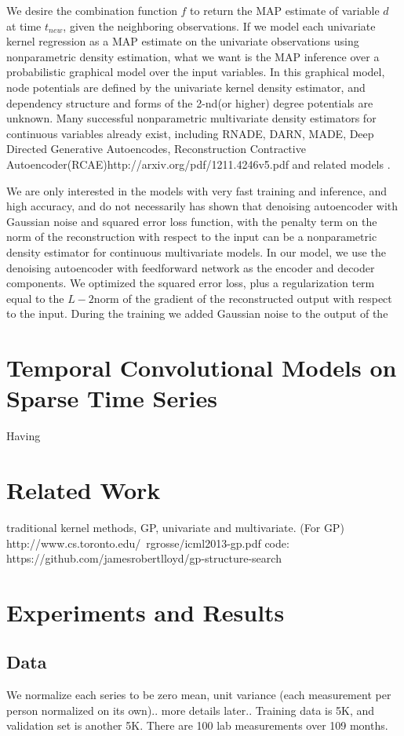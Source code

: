 \documentclass{article} %
\begin{document}
We desire the combination function $f$ to return the MAP estimate of variable $d$ at time $t_{new}$, given the neighboring observations. If we model each univariate kernel regression as a MAP estimate on the univariate observations using nonparametric density estimation, what we want is the MAP inference over a probabilistic graphical model over the input variables. In this graphical model, node potentials are defined by the univariate kernel density estimator, and dependency structure and forms of the 2-nd(or higher) degree potentials are unknown. 
Many successful nonparametric multivariate density estimators for continuous variables already exist, including RNADE\cite{}, DARN\cite{}, MADE\cite{}, Deep Directed Generative Autoencodes\cite{}, Reconstruction Contractive Autoencoder(RCAE)\cite{}http://arxiv.org/pdf/1211.4246v5.pdf and related models \cite{}\cite{}\cite{}.

We are only interested in the models with very fast training and inference, and high accuracy, and do not necessarily  \cite{} has shown that denoising autoencoder with Gaussian noise and squared error loss function, with the penalty term on the norm of the reconstruction with respect to the input can be a nonparametric density estimator for continuous multivariate models. 
In our model, we use the denoising autoencoder with feedforward network as the encoder and decoder components. We optimized the squared error loss, plus a regularization term equal to the $L-2$norm of the gradient of the reconstructed output with respect to the input. During the training we added Gaussian noise to the output of the 

\section{Temporal Convolutional Models on Sparse Time Series}
Having 



\section{Related Work}
traditional kernel methods, GP, univariate and multivariate.
(For GP)
http://www.cs.toronto.edu/~rgrosse/icml2013-gp.pdf
code: https://github.com/jamesrobertlloyd/gp-structure-search


\section{Experiments and Results}
\subsection{Data}
We normalize each series to be zero mean, unit variance (each measurement per person normalized on its own).. more details later..
Training data is 5K, and validation set is another 5K. There are 100 lab measurements over 109 months. 
\end{document}
